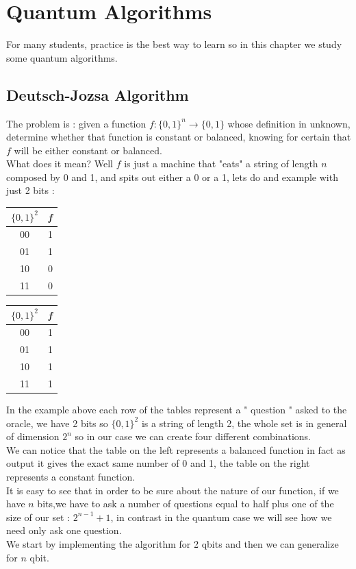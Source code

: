 \chapter{Quantum Algorithms}
For many students, practice is the best way to learn so in this chapter we study  some quantum algorithms.  
\section{Deutsch-Jozsa Algorithm}
The problem is : given a function $\textit{f} : \{0,1\}^n \rightarrow \{0,1\}$ whose definition in unknown, determine whether that function is constant or balanced, knowing for certain that $\textit{f}$ will be either constant or balanced. \\
What does it mean? Well $\textit{f}$ is just a machine that "eats" a string of length $n$ composed by 0 and 1, and spits out either a 0 or a 1, lets do and example with just 2 bits : 

\begin{center}
\begin{tabular}{|c|c|}
\hline
$\{0,1\}^2$ & \textit{f} \\
\hline
  00   & 1 \\
\hline
   01  &  1 \\
   \hline
   10 & 0 \\
   \hline
   11 & 0 \\
   \hline
\end{tabular}
\quad
\begin{tabular}{|c|c|}
\hline
$\{0,1\}^2$ & \textit{f} \\
\hline
  00   & 1 \\
\hline
   01  &  1 \\
   \hline
   10 & 1 \\
   \hline
   11 & 1 \\
   \hline
\end{tabular}   
\end{center}
In the example above each row of the tables represent a " question " asked to the oracle, we have 2 bits so $\{0,1\}^2$ is a string of length 2, the whole set is in general of dimension $2^n$ so in our case we can create four different combinations. \\
We can notice that the table on the left represents a balanced function in fact as output it gives the exact same number of 0 and 1, the table on the right represents a constant function. \\
It is easy to see that in order to be sure about the nature of our function, if we have $n$ bits,we have to ask a number of questions equal to half plus one of the size of our set : $2^{n-1} + 1$, in contrast in the quantum case we will see how we need only ask one question. \\ 
We start by implementing the algorithm for 2 qbits and then we can generalize for $n$ qbit.
\newpage
